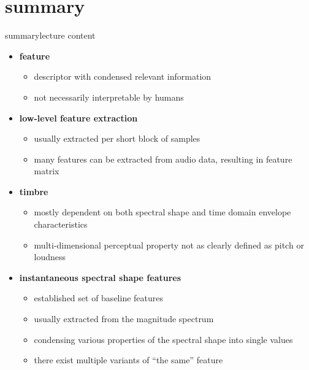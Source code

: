     \section{summary}
        \begin{frame}{summary}{lecture content}
            \begin{itemize}
                \item   \textbf{feature}
                    \begin{itemize}
                        \item   descriptor with condensed relevant information
                        \item   not necessarily interpretable by humans
                    \end{itemize}
                \bigskip
                \item   \textbf{low-level feature extraction}
                    \begin{itemize}
                        \item   usually extracted per short block of samples
                        \item   many features can be extracted from audio data, resulting in feature matrix
                    \end{itemize}
                \bigskip
                \item   \textbf{timbre}
                    \begin{itemize}
                        \item   mostly dependent on both spectral shape and time domain envelope characteristics
                        \item   multi-dimensional perceptual property not as clearly defined as pitch or loudness
                    \end{itemize}
                \bigskip
                \item   \textbf{instantaneous spectral shape features}
                    \begin{itemize}
                        \item   established set of baseline features
                        \item   usually extracted from the magnitude spectrum
                        \item   condensing various properties of the spectral shape into single values
                        \item   there exist multiple variants of ``the same'' feature
                    \end{itemize}
            \end{itemize}
        \end{frame}

